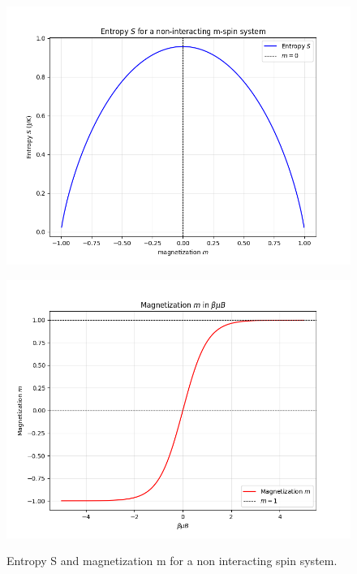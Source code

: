 \documentclass{article}
\begin{document}
\begin{figure}[h!]
    \centering
    \begin{minipage}{0.45\textwidth}
        \centering
        \includegraphics[width=\textwidth]{images/s-mc-spin-system.png}
        \label{fig:image1}
    \end{minipage}
    \hfill
    \begin{minipage}{0.45\textwidth}
        \centering
        \includegraphics[width=\textwidth]{images/m-mc-spin-system.png}
        \label{fig:image2}
    \end{minipage}
    \caption{
        Entropy S and magnetization m for a non interacting spin system.
    }
    \label{fig:spin-system}
\end{figure}
\end{document}
